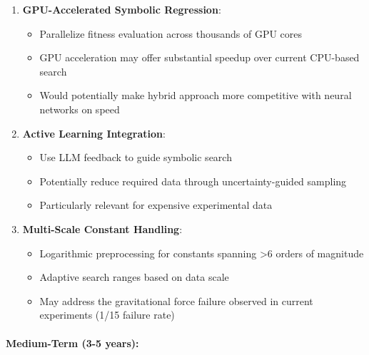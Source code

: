 \documentclass[twoside,11pt]{article}
\begin{document}
\begin{enumerate}
\item \textbf{GPU-Accelerated Symbolic Regression}:
   \begin{itemize}
   \item Parallelize fitness evaluation across thousands of GPU cores
   \item GPU acceleration may offer substantial speedup over current CPU-based search
   \item Would potentially make hybrid approach more competitive with neural networks on speed
   \end{itemize}

\item \textbf{Active Learning Integration}:
   \begin{itemize}
   \item Use LLM feedback to guide symbolic search
   \item Potentially reduce required data through uncertainty-guided sampling
   \item Particularly relevant for expensive experimental data
   \end{itemize}

\item \textbf{Multi-Scale Constant Handling}:
   \begin{itemize}
   \item Logarithmic preprocessing for constants spanning >6 orders of magnitude
   \item Adaptive search ranges based on data scale
   \item May address the gravitational force failure observed in current experiments (1/15 failure rate)
   \end{itemize}
\end{enumerate}

\paragraph{Medium-Term (3-5 years):}
\end{document}
